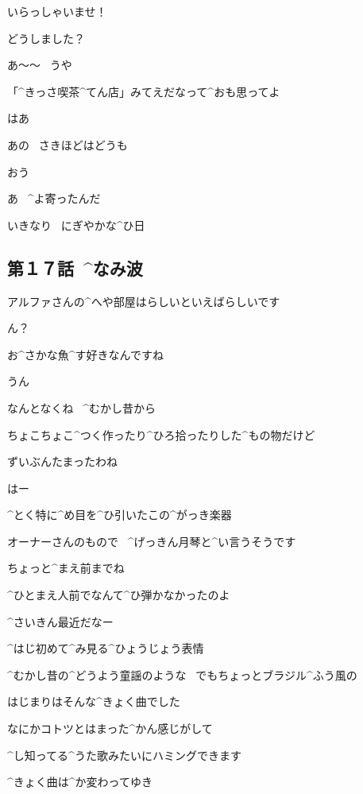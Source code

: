 \page[17]
\Kokone いらっしゃいませ！

\Alpha どうしました？

\Ojisan あ〜〜
\ うや

\Ojisan 「^{きっさ}{喫茶}^{てん}{店}」みてえだなって^{おも}{思}ってよ

\Alpha はあ

\page[18]
\Kokone あの
\ さきほどはどうも

\Ojisan おう

\Alpha あ
\ ^{よ}{寄}ったんだ

\Alpha いきなり
\ にぎやかな^{ひ}{日}


\subsection{第１７話\ ^{なみ}{波}}

\page[20]
\Kokone アルファさんの^{へや}{部屋}はらしいといえばらしいです

\page[21]
\Alpha ん？

\Kokone お^{さかな}{魚}^{す}{好}きなんですね

\Alpha うん

\Alpha なんとなくね
\ ^{むかし}{昔}から

\page[22]
\Alpha ちょこちょこ^{つく}{作}ったり^{ひろ}{拾}ったりした^{もの}{物}だけど

\Alpha ずいぶんたまったわね

\Kokone はー

\Kokone ^{とく}{特}に^{め}{目}を^{ひ}{引}いたこの^{がっき}{楽器}

\Kokone オーナーさんのもので
\ ^{げっきん}{月琴}と^{い}{言}うそうです

\page[23]
\Alpha ちょっと^{まえ}{前}までね

\Alpha ^{ひとまえ}{人前}でなんて^{ひ}{弾}かなかったのよ

\Alpha ^{さいきん}{最近}だなー

\page[24]
\Kokone ^{はじ}{初}めて^{み}{見}る^{ひょうじょう}{表情}

\page[25]
\Kokone ^{むかし}{昔}の^{どうよう}{童謡}のような
\ でもちょっとブラジル^{ふう}{風}の

\Kokone はじまりはそんな^{きょく}{曲}でした

\page[26]
\Kokone なにかコトツとはまった^{かん}{感}じがして

\Kokone ^{し}{知}ってる^{うた}{歌}みたいにハミングできます

\page[27]
\Kokone ^{きょく}{曲}は^{か}{変}わってゆき

